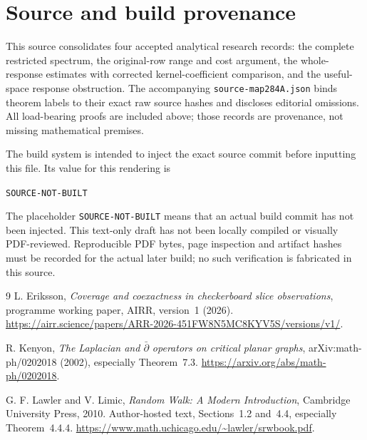 \documentclass[11pt]{article}
\providecommand{\SourceCommit}{SOURCE-NOT-BUILT}
\theoremstyle{definition}
\theoremstyle{remark}
\begin{document}
\appendix
\section{Source and build provenance}\label{app:provenance}
This source consolidates four accepted analytical research records: the
complete restricted spectrum, the original-row range and cost argument,
the whole-response estimates with corrected kernel-coefficient comparison,
and the useful-space response obstruction. The accompanying
\texttt{source-map284A.json} binds theorem labels to their exact raw source
hashes and discloses editorial omissions. All load-bearing proofs are
included above; those records are provenance, not missing mathematical
premises.

The build system is intended to inject the exact source commit before
inputting this file. Its value for this rendering is
\begin{center}\texttt{\SourceCommit}\end{center}
The placeholder \texttt{SOURCE-NOT-BUILT} means that an actual build commit
has not been injected. This text-only draft has not been locally compiled
or visually PDF-reviewed. Reproducible PDF bytes, page inspection and
artifact hashes must be recorded for the actual later build; no such
verification is fabricated in this source.

\begin{thebibliography}{9}
L. Eriksson, \emph{Coverage and coexactness in checkerboard slice observations},
programme working paper, AIRR, version~1 (2026).
\url{https://airr.science/papers/ARR-2026-451FW8N5MC8KYV5S/versions/v1/}.

R. Kenyon, \emph{The Laplacian and $\bar\partial$ operators on critical planar
graphs}, arXiv:math-ph/0202018 (2002), especially Theorem~7.3.
\url{https://arxiv.org/abs/math-ph/0202018}.

G. F. Lawler and V. Limic, \emph{Random Walk: A Modern Introduction},
Cambridge University Press, 2010. Author-hosted text, Sections~1.2 and~4.4,
especially Theorem~4.4.4.
\url{https://www.math.uchicago.edu/~lawler/srwbook.pdf}.
\end{thebibliography}
\end{document}
